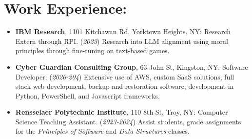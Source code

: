 \documentclass[12pt]{article}
\begin{document}
\section*{Work Experience:}
\begin{itemize}
    \itemsep0em 
    \item \textbf{IBM Research}, 1101 Kitchawan Rd, Yorktown Heights, NY: Research Extern through RPI. (\textit{2023}) Research into LLM alignment using moral principles through fine-tuning on text-based games.
    
    \item \textbf{Cyber Guardian Consulting Group}, 63 John St, Kingston, NY: Software Developer. (\textit{2020-204}) Extensive use of AWS, custom SaaS solutions, full stack web development, backup and restoration software, development in Python, PowerShell, and Javascript frameworks.
    
    \item \textbf{Rensselaer Polytechnic Institute}, 110 8th St, Troy, NY: Computer Science Teaching Assistant. (\textit{2023-2024}) Assist students, grade assignments for the \textit{Principles of Software} and \textit{Data Structures} classes.
\end{itemize}
\end{document}
